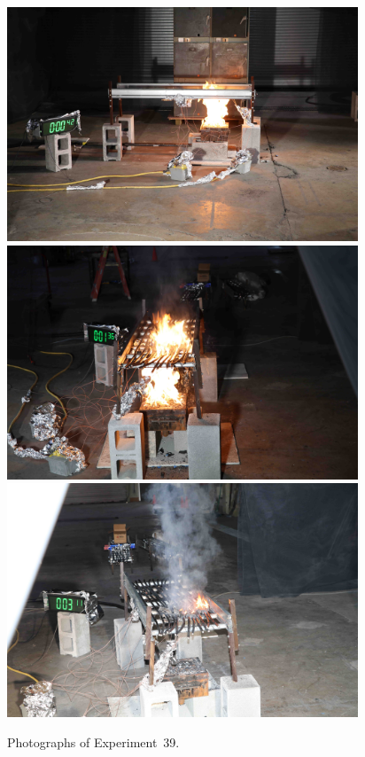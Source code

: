\begin{figure}[p]
\centering
\includegraphics[height=2.75in]{../FIGURES/Test_39_side} \\
\includegraphics[height=2.75in]{../FIGURES/Test_39_1_min_36_s} \\
\includegraphics[height=2.75in]{../FIGURES/Test_39_3_min_11_s}
\caption[Photographs of Experiment~39]{Photographs of Experiment~39.}
\label{fig:Test_39_photos}
\end{figure}


\clearpage

